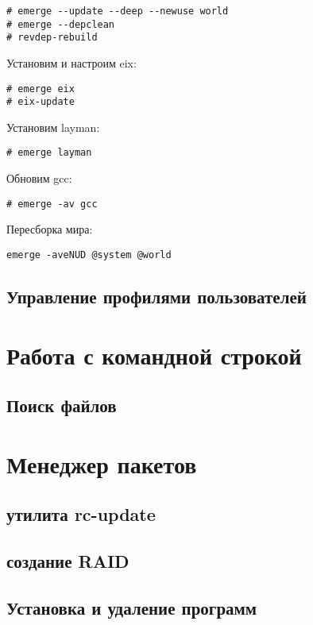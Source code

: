 \documentclass[12pt, a6paper]{article}
\begin{document}
\begin{verbatim}
# emerge --update --deep --newuse world
# emerge --depclean
# revdep-rebuild
\end{verbatim}

Установим и настроим eix:
\begin{verbatim}
# emerge eix
# eix-update
\end{verbatim}

Установим layman:
\begin{verbatim}
# emerge layman
\end{verbatim}

Обновим gcc:
\begin{verbatim}
# emerge -av gcc
\end{verbatim}

Пересборка мира:
\begin{verbatim}
emerge -aveNUD @system @world
\end{verbatim}

\subsection{Управление профилями пользователей}

\newpage 

\section{Работа с командной строкой}

\subsection{Поиск файлов}

\newpage

\section{Менеджер пакетов}

\subsection{утилита rc-update}

\subsection{создание RAID}

\subsection{Установка и удаление программ}
\end{document}
